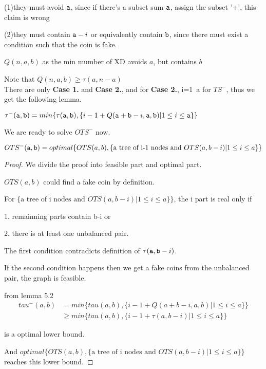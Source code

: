 (1)they must avoid $\mathtt{a}$, since if there's a subset sum $\mathtt{a}$, assign the subset '+', this claim is wrong

(2)they must contain $\mathtt{a}-i$ or equivalently contain $\mathtt{b}$, since there must exist a condition such that the coin is fake.


\begin{definition}
$Q(n,a,b)$ as the min mumber of XD avoids $a$, but contains $b$ 
\end{definition}

Note that $Q(n,a,b)\geq\tau(a,n-a)$\\

There are only \textbf{Case 1.} and \textbf{Case 2.}, 
and for \textbf{Case 2.}, i=1~a for $TS^-$, thus we get the following lemma.

\begin{lemma}
$\tau^-(\mathtt{a},\mathtt{b})=min\{\tau(\mathtt{a},\mathtt{b}), \{i-1+Q(\mathtt{a}+\mathtt{b}-i,\mathtt{a},\mathtt{b}) | 1\leq i\leq\mathtt{a}\} \}$
\end{lemma}

We are ready to solve $OTS^-$ now.

\begin{theorem}
$OTS^-(\mathtt{a},\mathtt{b})=optimal\{OTS(a,b), \{\text{a tree of i-1 nodes and }OTS(a,b-i) |1\leq i\leq a\}\}$
\end{theorem}

\begin{proof}
We divide the proof into feasible part and optimal part.


$OTS(a,b)$ could find a fake coin by definition.

For $\{\text{a tree of i nodes and }OTS(a,b-i) |1\leq i\leq a\}\}$, the i part is real only if 

1. remainning parts contain b-i or 

2. there is at least one unbalanced pair. 

The first condition contradicts definition of $\tau(\mathtt{a},\mathtt{b}-i)$.

If the second condition happens then we get a fake coins from the unbalanced pair, the graph is feasible.

from lemma 5.2
\begin{align*}
tau^-(a,b)&=min\{tau(a,b),\{i-1+Q(a+b-i,a,b) | 1\leq i\leq a\} \}\\
&\geq min\{tau(a,b), \{i-1+\tau(a,b-i) | 1\leq i\leq a\} \}
\end{align*}

is a optimal lower bound.

And $optimal\{OTS(a,b), \{\text{a tree of i nodes and }OTS(a,b-i) |1\leq i\leq a\}\}$ reaches this lower bound.

\end{proof}

